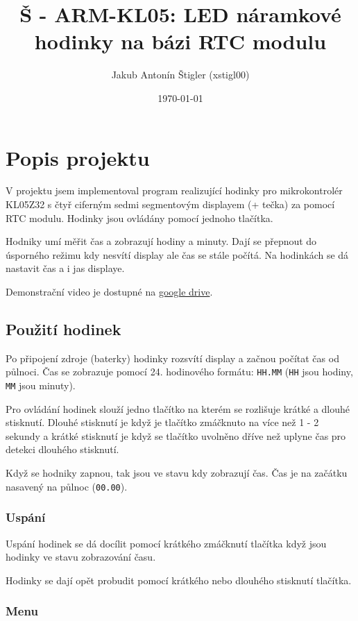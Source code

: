 \documentclass{article}
\title{Š - ARM-KL05: LED náramkové hodinky na bázi RTC modulu}
\author{Jakub Antonín Štigler (xstigl00)}
\date{\today}
\begin{document}
\maketitle

\newpage

\tableofcontents

\newpage

\section{Popis projektu}
V projektu jsem implementoval program realizující hodinky pro mikrokontrolér
KL05Z32 s čtyř ciferným sedmi segmentovým displayem (+ tečka) za pomocí RTC
modulu. Hodinky jsou ovládány pomocí jednoho tlačítka.

Hodniky umí měřit čas a zobrazují hodiny a minuty. Dají se přepnout do
úsporného režimu kdy nesvítí display ale čas se stále počítá. Na hodinkách se
dá nastavit čas a i jas displaye.

Demonstrační video je dostupné na \href{
https://drive.google.com/file/d/11q4ZZumjkLexDSFRuGtCvZs_ZVa2TMyn/view?usp=sharing
}{google drive}.

\subsection{Použití hodinek}
Po připojení zdroje (baterky) hodinky rozsvítí display a začnou počítat čas od
půlnoci. Čas se zobrazuje pomocí 24. hodinového formátu: \verb|HH.MM|
(\verb|HH| jsou hodiny, \verb|MM| jsou minuty).

Pro ovládání hodinek slouží jedno tlačítko na kterém se rozlišuje krátké a
dlouhé stisknutí. Dlouhé stisknutí je když je tlačítko zmáčknuto na více než
1 - 2 sekundy a krátké stisknutí je když se tlačítko uvolněno dříve než uplyne
čas pro detekci dlouhého stisknutí.

Když se hodniky zapnou, tak jsou ve stavu kdy zobrazují čas. Čas je na začátku
nasavený na půlnoc (\verb|00.00|).

\subsubsection{Uspání}

Uspání hodinek se dá docílit pomocí krátkého zmáčknutí tlačítka když jsou
hodinky ve stavu zobrazování času.

Hodinky se dají opět probudit pomocí krátkého nebo dlouhého stisknutí tlačítka.

\subsubsection{Menu}
\end{document}
